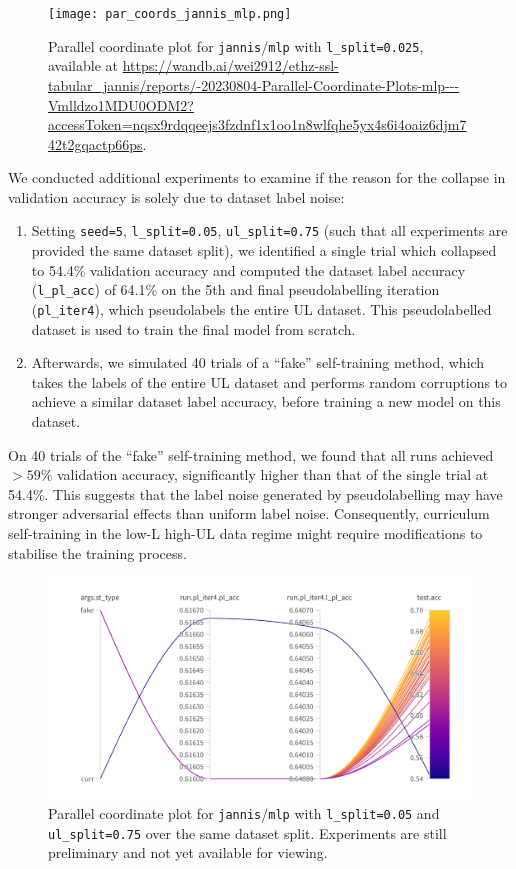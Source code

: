 \documentclass{article}
\begin{document}
\begin{figure}[htbp]
  \centering
  \texttt{[image: par\_coords\_jannis\_mlp.png]}
  \caption{Parallel coordinate plot for \texttt{jannis}/\texttt{mlp} with
  \texttt{l\_split=0.025}, available at
  {\small\url{https://wandb.ai/wei2912/ethz-ssl-tabular_jannis/reports/-20230804-Parallel-Coordinate-Plots-mlp---Vmlldzo1MDU0ODM2?accessToken=nqsx9rdqqeejs3fzdnf1x1oo1n8wlfqhe5yx4s6i4oaiz6djm742t2gqactp66ps}}.}
  \label{fig:par_coords_jannis_mlp}
\end{figure}

We conducted additional experiments to examine if the reason for the collapse in
validation accuracy is solely due to dataset label noise:
\begin{enumerate}
  \item Setting \texttt{seed=5}, \texttt{l\_split=0.05}, \texttt{ul\_split=0.75} (such
  that all experiments are provided the same dataset split), we identified a single
  trial which collapsed to 54.4\% validation accuracy and computed the dataset label
  accuracy (\texttt{l\_pl\_acc}) of 64.1\% on the 5th and final pseudolabelling
  iteration (\texttt{pl\_iter4}), which pseudolabels the entire UL dataset.
  This pseudolabelled dataset is used to train the final model from scratch.
  \item Afterwards, we simulated 40 trials of a ``fake'' self-training method, which
  takes the labels of the entire UL dataset and performs random corruptions to achieve a
  similar dataset label accuracy, before training a new model on this dataset.
\end{enumerate}
On 40 trials of the ``fake'' self-training method, we found that all runs achieved
$> 59\%$ validation accuracy, significantly higher than that of the single trial at
54.4\%.
This suggests that the label noise generated by pseudolabelling may have stronger
adversarial effects than uniform label noise.
Consequently, curriculum self-training in the low-L high-UL data regime might require
modifications to stabilise the training process.

\begin{figure}[htbp]
  \centering
  \includegraphics[width=\columnwidth]{par_coords_jannis_mlp_simul_noise.png}
  \caption{Parallel coordinate plot for \texttt{jannis}/\texttt{mlp} with
  \texttt{l\_split=0.05} and \texttt{ul\_split=0.75} over the same dataset split.
  Experiments are still preliminary and not yet available for viewing.}
  \label{fig:par_coords_jannis_mlp_simul_noise}
\end{figure}
\end{document}
